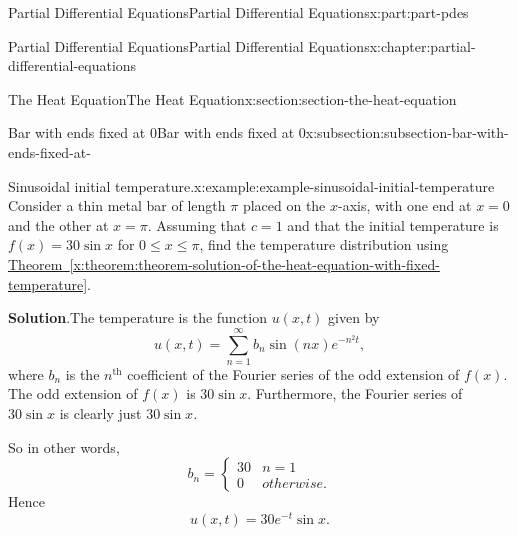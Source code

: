 \documentclass[twoside,10pt,]{book}
\newcommand{\blocktitlefont}{\relax}
\newcommand{\xreffont}{\relax}
\numberwithin{equation}{part}
\renewcommand{\th}{\text{th}}
\newcommand{\amp}{&}
\begin{document}
\begin{partptx}{Partial Differential Equations}{}{Partial Differential Equations}{}{}{x:part:part-pdes}
\begin{chapterptx}{Partial Differential Equations}{}{Partial Differential Equations}{}{}{x:chapter:partial-differential-equations}
\begin{sectionptx}{The Heat Equation}{}{The Heat Equation}{}{}{x:section:section-the-heat-equation}
\begin{subsectionptx}{Bar with ends fixed at \(0\)}{}{Bar with ends fixed at \(0\)}{}{}{x:subsection:subsection-bar-with-ends-fixed-at-}
\begin{example}{Sinusoidal initial temperature.}{x:example:example-sinusoidal-initial-temperature}
Consider a thin metal bar of length \(\pi\) placed on the \(x\)-axis, with one end at \(x=0\) and the other at \(x=\pi\). Assuming that \(c=1\) and that the initial temperature is \(f(x) = 30\sin x\) for \(0\leq x\leq\pi\), find the temperature distribution using \hyperref[x:theorem:theorem-solution-of-the-heat-equation-with-fixed-temperature]{Theorem~{\xreffont\ref{x:theorem:theorem-solution-of-the-heat-equation-with-fixed-temperature}}}.%
\par\smallskip%
\noindent\textbf{\blocktitlefont Solution}.\hypertarget{g:solution:idp105548818082336}{}\quad{}The temperature is the function \(u(x,t)\) given by%
\begin{equation*}
u(x,t) = \sum_{n=1}^{\infty}b_{n}\sin(n x)e^{-n^{2}t},
\end{equation*}
where \(b_{n}\) is the \(n^{\th}\) coefficient of the Fourier series of the odd extension of \(f(x)\). The odd extension of \(f(x)\) is \(30\sin x\). Furthermore, the Fourier series of \(30\sin x\) is clearly just \(30\sin x\).%
\par
So in other words,%
\begin{equation*}
b_{n} = \begin{cases} 30 \amp n=1 \\ 0 \amp otherwise.\end{cases}
\end{equation*}
Hence%
\begin{equation*}
u(x,t) = 30e^{-t}\sin x.
\end{equation*}
%
\end{example}
\end{subsectionptx}
\end{sectionptx}
\end{chapterptx}
  \end{partptx}
%
\appendix%
%
\end{document}
